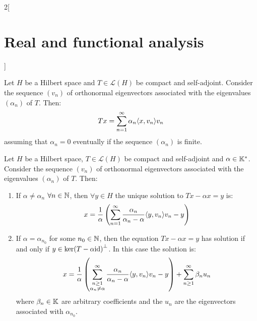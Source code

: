 \documentclass[../../../main_math.tex]{subfiles}
\begin{document}
\begin{multicols}{2}[\section{Real and functional analysis}]
\begin{lemma}
  \end{lemma}
  \begin{important}
    \begin{theorem} \label{RFA:representationtheorem}
      Let $H$ be a Hilbert space and $T\in\mathcal{L}(H)$ be compact and self-adjoint. Consider the sequence $(v_n)$ of orthonormal eigenvectors associated with the eigenvalues $(\alpha_n)$ of $T$. Then: $$Tx=\sum_{n=1}^\infty\alpha_n{\left\langle x,v_n\right\rangle}v_n$$ assuming that $\alpha_n=0$ eventually if the sequence $(\alpha_n)$ is finite.
    \end{theorem}
  \end{important}
  \begin{theorem}
    Let $H$ be a Hilbert space, $T\in\mathcal{L}(H)$ be compact and self-adjoint and $\alpha\in\mathbb{K}^*$. Consider the sequence $(v_n)$ of orthonormal eigenvectors associated with the eigenvalues $(\alpha_n)$ of $T$. Then:
    \begin{enumerate}
      \item If $\alpha\ne\alpha_n$ $\forall n\in\mathbb{N}$, then $\forall y\in H$ the unique solution to $Tx-\alpha x=y$ is: $$x=\frac{1}{\alpha}\left(\sum_{n=1}^\infty\frac{\alpha_n}{\alpha_n-\alpha}{\left\langle y,v_n\right\rangle}v_n -y\right)$$
      \item If $\alpha=\alpha_{n_0}$ for some $n_0\in\mathbb{N}$, then the equation $Tx-\alpha x=y$ has solution if and only if $y\in {\ker(T-\alpha \mathrm{id})}^\perp$. In this case the solution is: $$x=\frac{1}{\alpha}\left(\sum_{\substack{n\geq 1\\\alpha_n\ne\alpha}}^\infty\frac{\alpha_n}{\alpha_n-\alpha}{\left\langle y,v_n\right\rangle}v_n -y\right) + \sum_{n\geq 1}^\infty \beta_nu_n$$
            where $\beta_n\in\mathbb{K}$ are arbitrary coefficients and the $u_n$ are the eigenvectors associated with $\alpha_{n_0}$.
    \end{enumerate}
  \end{theorem}
\end{multicols}
\end{document}
